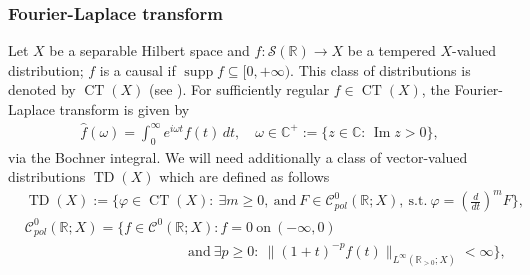 \documentclass[]{article}
\numberwithin{equation}{section}
\numberwithin{theorem}{section}
\numberwithin{lemma}{section}
\numberwithin{corollary}{section}
\numberwithin{proposition}{section}
\numberwithin{definition}{section}
\renewcommand{\Im}{\operatorname{Im}}
\begin{document}
	\subsubsection{Fourier-Laplace transform}
	\label{sec:ft}
	Let $X$ be a separable Hilbert space and $f: \mathcal{S}(\mathbb{R}) \to X$ be a tempered $X$-valued distribution; %
	$f$ is a causal if $\operatorname{supp}f\subseteq [0, +\infty)$. 
	This class of distributions is denoted by $\operatorname{CT}(X)$ (see \cite[Section 2.1]{sayas}). 
	For sufficiently regular $ f \in \operatorname{CT}(X) $,  the Fourier-Laplace transform is given by 
	\begin{align}
		\label{eq:fourier_laplace_transforme}
		\hat{f}(\omega) = \int_{0}^{\infty} e^{i \omega t} f(t) \, dt, \quad \omega\in \mathbb{C}^+:=\{z\in \mathbb{C}: \, \Im z>0\},
	\end{align}
	via the Bochner integral. We will need additionally a class of vector-valued distributions  $\operatorname{TD}(X)$ which are defined as follows 
	\begin{align*}%
		&\operatorname{TD}(X) :=\{\varphi\in \operatorname{CT}(X): ~ \exists m\geq 0, ~ \text{and} ~ F\in \mathcal{C}^0_{pol}(\mathbb{R}; X), ~ \text{s.t.} ~ \varphi=\left(\frac{d}{dt}\right)^mF\},  \\
		&\mathcal{C}^0_{pol}(\mathbb{R}; X) =\{f\in \mathcal{C}^0(\mathbb{R}; X): f=0 ~ \text{on} ~(-\infty,0) \\
		&\hspace{140pt}\text{and} ~ \exists p\geq 0: ~ \|(1+t)^{-p}f(t)\|_{L^{\infty}(\mathbb{R}_{>0}; X)}<\infty\},
	\end{align*}
\end{document}
